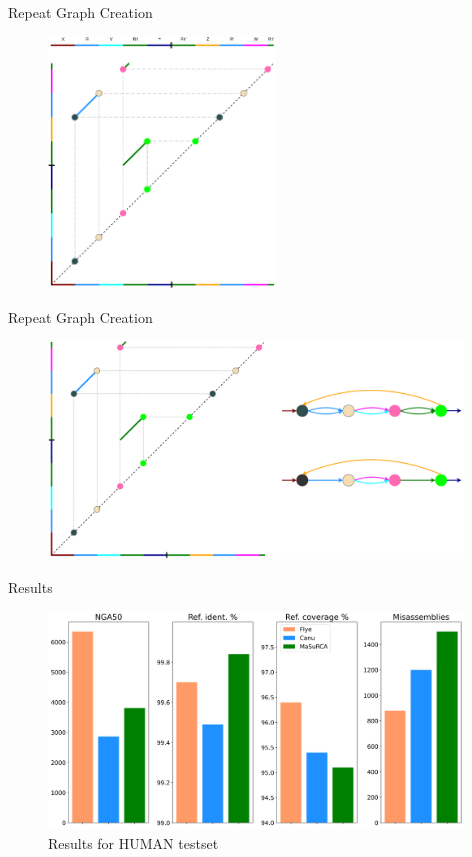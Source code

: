 \documentclass{beamer}
\begin{document}
  \begin{frame}{Repeat Graph Creation}
    \begin{figure}
      \includegraphics[width=6cm]{presentation/images/dot_plot.png}
      \label{fig:bp_graph}
    \end{figure}
  \end{frame}

  \begin{frame}{Repeat Graph Creation}
    \begin{figure}
      \includegraphics[width=11cm]{presentation/images/plot_to_repeat_graph.png}
      \label{fig:repeat_graph}
    \end{figure}
  \end{frame}

  \begin{frame}{Results}
    \begin{figure}
      \includegraphics[width=11cm]{presentation/images/results_HUMAN.png}
      \caption{Results for HUMAN testset}
      \label{fig:results}
    \end{figure}
  \end{frame}
\end{document}

